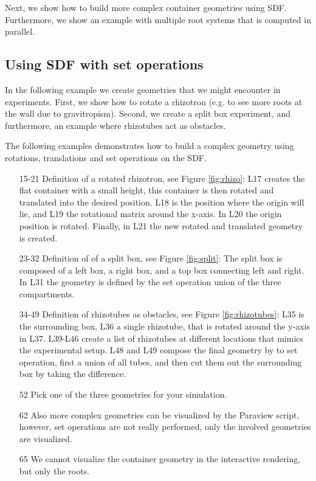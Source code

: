 Next, we show how to build more complex container geometries using SDF. 
Furthermore, we show an example with multiple root systems that is computed in parallel.

\subsection{Using SDF with set operations}

In the following example we create geometries that we might encounter in experiments. 
First, we show how to rotate a rhizotron (e.g. to see more roots at the wall due to gravitropism). 
Second, we create a split box experiment, and furthermore, an example where rhizotubes act as obstacles.

The following examples demonstrates how to build a complex geometry using rotations, translations and set operations on the SDF.



\begin{itemize}

\item[15-21] Definition of a rotated rhizotron, see Figure \ref{fig:rhizo}: 
L17 creates the flat container with a small height, this container is then rotated and translated into the desired position. 
L18 is the position where the origin will lie, and L19 the rotational matrix around the x-axis. 
In L20 the origin position is rotated. Finally, in L21 the new rotated and translated geometry is created. 
\item[23-32] Definition of of a split box, see Figure \ref{fig:split}: 
The split box is composed of a left box, a right box, and a top box connecting left and right. 
In L31 the geometry is defined by the set operation union of the three compartments. 
\item[34-49] Definition of rhizotubes as obstacles, see Figure \ref{fig:rhizotubes}: L35 is the surrounding box, 
L36 a single rhizotube, that is rotated around the y-axis in L37. 
L39-L46 create a list of rhizotubes at different locations that mimics the experimental setup. 
L48 and L49 compose the final geometry by to set operation, first a union of all tubes, 
and then cut them out the surrounding box by taking the difference. 
\item[52] Pick one of the three geometries for your simulation.
\item[62] Also more complex geometries can be visualized by the Paraview script, 
however, set operations are not really performed, only the involved geometries are visualized.
\item[65] We cannot visualize the container geometry in the interactive rendering, but only the roots. 

\end{itemize}

